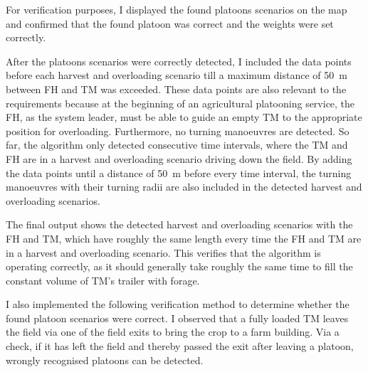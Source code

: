 For verification purposes, I displayed the found platoons scenarios on the map
and confirmed that the found platoon was correct and the weights were set correctly.

After the platoons scenarios were correctly detected, I included the data points before each harvest and overloading scenario
till a maximum distance of \SI{50}{\metre} between \ac{FH} and \ac{TM} was exceeded.
These data points are also relevant to the requirements because at the beginning of an agricultural platooning service,
the \ac{FH}, as the system leader, must be able to guide an empty \ac{TM} to the appropriate position for overloading.
Furthermore, no turning manoeuvres are detected.
So far, the algorithm only detected consecutive time intervals, where the
\ac{TM} and \ac{FH} are in a harvest and overloading scenario driving down the field.
By adding the data points until a distance
of \SI{50}{\metre} before every time interval, the turning manoeuvres with their turning radii are also included in the detected
harvest and overloading scenarios.

The final output shows the detected harvest and overloading scenarios with the \ac{FH} and \ac{TM}, which have roughly the same
length every time the \ac{FH} and \ac{TM} are in a harvest and overloading scenario.
This verifies that the algorithm is operating correctly,
as it should generally take roughly the same time to fill the constant volume of \ac{TM}'s trailer with forage.

I also implemented the following verification method to determine whether the found platoon scenarios were correct.
I observed that a fully loaded \ac{TM} leaves the field via one of the field exits to bring the crop to a farm building.
Via a check, if it has left the field and thereby passed the exit after leaving a platoon, wrongly recognised
platoons can be detected.

